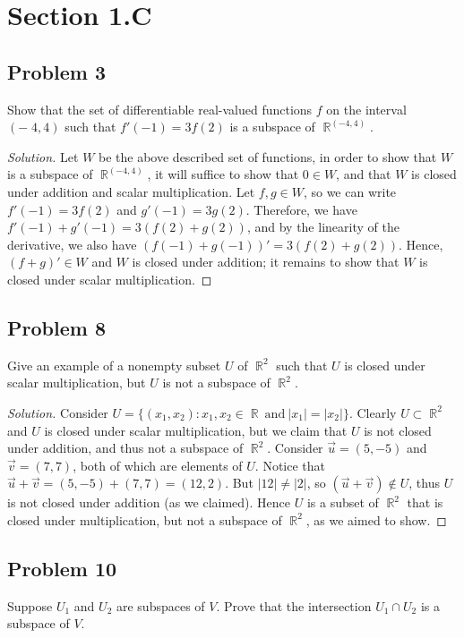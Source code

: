 \documentclass[letterpaper, 12pt]{amsart}
\DeclareMathOperator{\R}{\mathbb{R}}
\theoremstyle{definition}  %
\begin{document}
	\section*{Section 1.C}	
		\subsection*{Problem 3}
		Show that the set of differentiable real-valued functions $f$ on the interval $(-􏰈4, 4)$ such that $f'(-1) = 3f(2)$ is a subspace of $\R^{(-4,4)}$.

		\begin{proof}[Solution]
		Let $W$ be the above described set of functions, in order to show that $W$ is a subspace of $\R^{(-4,4)}$, it will suffice to show that $0 \in W$, and that $W$ is closed under addition and scalar multiplication.
		Let $f,g \in W$, so we can write $f'(-1) = 3f(2)$ and $g'(-1) = 3g(2)$.
		Therefore, we have $f'(-1) + g'(-1) = 3(f(2) + g(2))$, and by the linearity of the derivative, we also have $(f(-1) + g(-1))' = 3(f(2) + g(2))$.
		Hence, $(f + g)' \in W$ and $W$ is closed under addition; it remains to show that $W$ is closed under scalar multiplication.
		\end{proof}

		\subsection*{Problem 8}
		Give an example of a nonempty subset $U$ of $\R^{2}$ such that $U$ is closed under scalar multiplication, but $U$ is not a subspace of $\R^{2}$.

		\begin{proof}[Solution]
		Consider $U = \{ (x_{1},x_{2}) : x_{1},x_{2} \in \R \ \text{and} \ |x_{1}| = |x_{2}| \}$.
		Clearly $U \subset \R^{2}$ and $U$ is closed under scalar multiplication, but we claim that $U$ is not closed under addition, and thus not a subspace of $\R^{2}$.
		Consider $\vec{u} = (5,-5)$ and $\vec{v} = (7,7)$, both of which are elements of $U$.
		Notice that $\vec{u} + \vec{v} = (5,-5) + (7,7) = (12,2)$.
		But $|12| \neq |2|$, so $(\vec{u} + \vec{v}) \notin U$, thus $U$ is not closed under addition (as we claimed).
		Hence $U$ is a subset of $\R^{2}$ that is closed under multiplication, but not a subspace of $\R^{2}$, as we aimed to show.
		\end{proof}	

		\subsection*{Problem 10}
		Suppose $U_{1}$ and $U_{2}$ are subspaces of $V$. 
		Prove that the intersection $U_{1} \cap U_{2}$ is a subspace of $V$.
\end{document}
